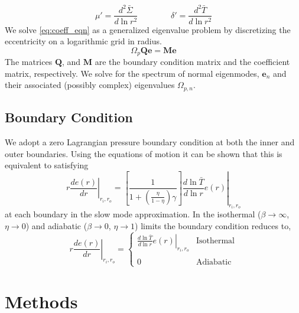 \documentclass[apj]{emulateapj}
\begin{document}
\begin{equation}
\mu ' = \frac{d ^2 \bar{\Sigma}}{d \ln r^2} 
\qquad \qquad
\delta' = \frac{d ^2 \bar{T}}{d \ln r^2}
\end{equation}
We solve \eqref{eq:coeff_eqn} as a generalized eigenvalue problem by discretizing the eccentricity on a logarithmic grid in radius. 
\begin{equation}
\Omega_p \mathbf{Q} \mathbf{e} = \mathbf{M} \mathbf{e}
\end{equation}
The matrices $\mathbf{Q}$, and $\mathbf{M}$ are the boundary condition matrix and the coefficient matrix, respectively. We solve for the spectrum of normal eigenmodes, $\mathbf{e}_n$ and their associated (possibly complex) eigenvalues $\Omega_{p,n}$. 








\subsection{Boundary Condition} 
We adopt a zero Lagrangian pressure boundary condition at both the inner and outer boundaries. Using the equations of motion it can be shown that this is equivalent to satisfying 
\begin{equation}
\left. r \frac{d e(r) }{d r}\right|_{r_i, r_o} = \left. \left[\frac{1}{1 + \left( \frac{\eta}{1- \eta} \right) \gamma } \right] \frac{d \ln \bar{T}}{d \ln r } e(r) \right|_{r_i, r_o}
\end{equation}
at each boundary in the slow mode approximation. In the isothermal ($\beta \rightarrow \infty$, $\eta \rightarrow 0$) and adiabatic ($\beta \rightarrow 0$, $\eta \rightarrow 1$) limits the boundary condition reduces to,
\begin{equation}
\left. r \frac{d e(r)}{d r} \right|_{r_i, r_o} = 
\begin{cases}
\left. \frac{d \ln \bar{T}}{d \ln r} e(r) \right|_{r_i,r_o}  & \text{Isothermal} \\ \\ 
0 & \text{Adiabatic}
\end{cases}
\end{equation}


\section{Methods}
\end{document}
